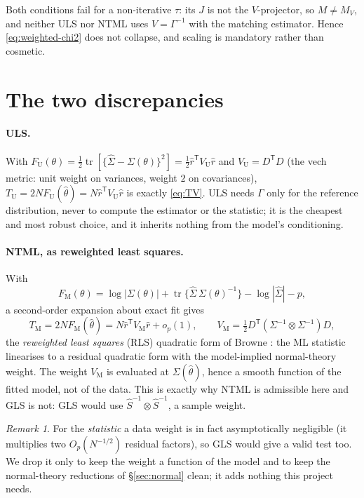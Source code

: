 \documentclass[11pt]{article}
\newcommand{\tr}{\operatorname{tr}}
\newcommand{\T}{^{\mathsf T}}
\newcommand{\Ninv}{^{-1}}
\theoremstyle{plain}
\theoremstyle{definition}
\theoremstyle{remark}
\newtheorem*{remark}{Remark}
\begin{document}
Both conditions fail for a non-iterative $\tau$: its $J$ is not the
$V$-projector, so $M\neq M_V$, and neither ULS nor NTML uses $V=\Gamma\Ninv$
with the matching estimator. Hence \eqref{eq:weighted-chi2} does not collapse,
and scaling is mandatory rather than cosmetic.

\section{The two discrepancies}\label{sec:disc}

\paragraph{ULS.} With $F_{\mathrm U}(\theta)=\tfrac12\tr[\{\widehat\Sigma-
\Sigma(\theta)\}^2]=\tfrac12\hat r\T V_{\mathrm U}\hat r$ and
$V_{\mathrm U}=D\T D$ (the vech metric: unit weight on variances, weight $2$ on
covariances), $T_{\mathrm U}=2NF_{\mathrm U}(\hat\theta)=N\hat r\T V_{\mathrm U}
\hat r$ is exactly \eqref{eq:TV}. ULS needs $\Gamma$ only for the reference
distribution, never to compute the estimator or the statistic; it is the
cheapest and most robust choice, and it inherits nothing from the model's
conditioning.

\paragraph{NTML, as reweighted least squares.} With
\[
  F_{\mathrm M}(\theta)=\log|\Sigma(\theta)|
    +\tr\{\widehat\Sigma\,\Sigma(\theta)\Ninv\}-\log|\widehat\Sigma|-p,
\]
a second-order expansion about exact fit gives
\begin{equation}\label{eq:rls}
  T_{\mathrm M}=2NF_{\mathrm M}(\hat\theta)
    =N\hat r\T V_{\mathrm M}\hat r+o_p(1),\qquad
  V_{\mathrm M}=\tfrac12 D\T(\Sigma\Ninv\otimes\Sigma\Ninv)D,
\end{equation}
the \emph{reweighted least squares} (RLS) quadratic form of Browne
\cite{browne1974}: the ML statistic linearises to a residual quadratic form with
the model-implied normal-theory weight. The weight $V_{\mathrm M}$ is evaluated
at $\Sigma(\hat\theta)$, hence a smooth function of the fitted model, not of the
data. This is exactly why NTML is admissible here and GLS is not: GLS would use
$\widehat S\Ninv\otimes\widehat S\Ninv$, a sample weight.

\begin{remark}
For the \emph{statistic} a data weight is in fact asymptotically negligible
(it multiplies two $O_p(N^{-1/2})$ residual factors), so GLS would give a valid
test too. We drop it only to keep the weight a function of the model and to keep
the normal-theory reductions of \S\ref{sec:normal} clean; it adds nothing this
project needs.
\end{remark}
\end{document}
